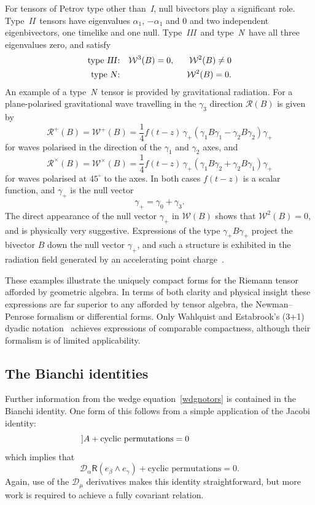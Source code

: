 \documentclass[a4paper]{article}
\numberwithin{equation}{section}
\newcommand{\hs}[1]{\hspace*{#1cm}}
\newcommand{\wdg}{\! \wedge \!}
\newcommand{\qrt}{{\textstyle \frac{1}{4}}}
\newcommand{\eqv}{=}
\newcommand{\alp}{\alpha}
\newcommand{\bet}{\beta}
\newcommand{\gam}{\gamma}
\newcommand{\cld}{{\mathcal{D}}}
\newcommand{\clr}{{\mathcal{R}}}
\newcommand{\clw}{{\mathcal{W}}}
\newcommand{\gi}{\gamma_{1}}
\newcommand{\gj}{\gamma_{2}}
\newcommand{\gk}{\gamma_{3}}
\newcommand{\go}{\gamma_{0}}
\newcommand{\liR}{\mathsf{R}}
\newcommand{\slI}{\textsl{I}}
\newcommand{\slII}{\textsl{II}}
\newcommand{\slIII}{\textsl{III}}
\newcommand{\slN}{\textsl{N}}
\begin{document}
For tensors of Petrov type other than~\slI, null bivectors play a
significant role.  Type~\slII\ tensors have eigenvalues $\alp_1$,
$-\alp_1$ and 0 and two independent eigenbivectors, one timelike and
one null.  Type~\slIII\ and type~\slN\ have all three eigenvalues zero,
and satisfy 
%
\begin{eqnarray}
\mbox{type~\slIII:} & & \clw^3(B) = 0,  \hs{0.6} \clw^2(B) \neq 0 \\ 
\mbox{type~\slN:} & & \clw^2(B) = 0.
\end{eqnarray}
%
An example of a type~\slN\ tensor is provided by gravitational
radiation.   For a plane-polarised gravitational wave
travelling in the $\gk$ direction $\clr(B)$ is given by
%
\begin{equation}
\clr^+(B) = \clw^+(B) = \qrt f(t-z) \, \gam_+( \gi B \gi - \gj B \gj
)\gam_+ 
\end{equation}
%
for waves polarised in the direction of the $\gi$ and $\gj$ axes,
and
%
\begin{equation}
\clr^\times(B) = \clw^\times(B) = \qrt f(t-z) \, \gam_+ ( \gi B \gj +
\gj B \gi ) \gam_+
\end{equation}
%
for waves polarised at $45^\circ$ to the axes.  In both cases $f(t-z)$
is a scalar function, and $\gam_+$ is the null vector
%
\begin{equation}
\gam_+ \eqv \go + \gk.
\end{equation}
%
The direct appearance of the null vector $\gam_+$ in $\clw(B)$ shows
that $\clw^2(B)=0$, and is physically very suggestive.  Expressions of
the type $\gam_+ B \gam_+$ project the bivector $B$ down the null
vector $\gam_+$, and such a structure is exhibited in the radiation
field generated by an accelerating point charge~\cite{DGL93-notreal}.


These examples illustrate the uniquely compact forms for
the Riemann tensor afforded by geometric algebra.  In terms of both
clarity and physical insight these expressions are far superior to
any afforded by tensor algebra, the Newman--Penrose formalism or
differential forms.  Only Wahlquist and Estabrook's (3+1) dyadic
notation~\cite{wah65,wah92} achieves expressions of comparable
compactness, although their formalism is of limited applicability.


\subsection{The Bianchi identities}

Further information from the wedge equation~\eqref{wdgnotors} is contained
in the Bianchi identity.  One form of this follows from a simple
application of the Jacobi identity:
%
\begin{equation}
[\cld_\alp, [\cld_\bet,\cld_\gam ]] A + \mbox{cyclic permutations} = 0
\hs{2} 
\end{equation}
%
which implies that
%
\begin{equation}
\cld_\alp \liR(e_\bet \wdg e_\gam) + \mbox{cyclic permutations} = 0.
\label{S-Bi1}
\end{equation}
%
Again, use of the $\cld_\mu$ derivatives makes this identity
straightforward, but more work is required to achieve a fully
covariant relation.  
\end{document}
